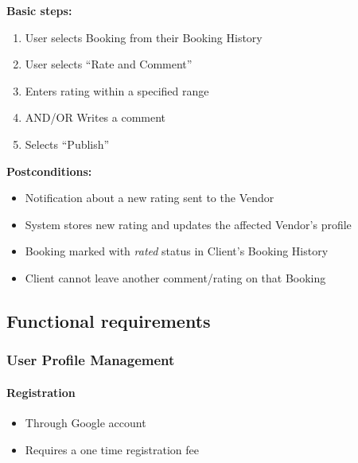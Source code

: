 \documentclass[11pt,a4paper]{article}
\begin{document}
\noindent \textbf{Basic steps:}
\begin{enumerate}
  \item User selects Booking from their Booking History
  \item User selects ``Rate and Comment''
  \item Enters rating within a specified range
  \item AND/OR Writes a comment  
  \item Selects ``Publish''
\end{enumerate}

\noindent \textbf{Postconditions:}
\begin{itemize}
  \item Notification about a new rating sent to the Vendor
  \item System stores new rating and updates the affected Vendor's profile
  \item Booking marked with \textit{rated} status in Client's Booking History
  \item Client cannot leave another comment/rating on that Booking
\end{itemize}

\subsection{Functional requirements}

\subsubsection{User Profile Management}

\paragraph{Registration}

\begin{itemize}
  \item Through Google account
  \item Requires a one time registration fee
\end{itemize}
\end{document}
